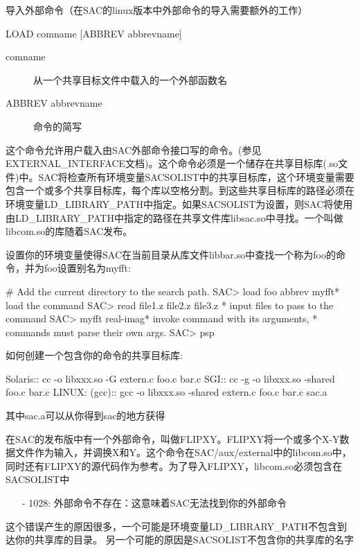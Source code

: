 \label{cmd:load}

导入外部命令（在SAC的linux版本中外部命令的导入需要额外的工作）

\begin{SACSTX}
LOAD comname [ABBREV abbrevname]
\end{SACSTX}

\begin{description}
\item [comname] 从一个共享目标文件中载入的一个外部函数名 
\item [ABBREV abbrevname] 命令的简写 
\end{description}

这个命令允许用户载入由SAC外部命令接口写的命令。(参见EXTERNAL\_INTERFACE文档)。这个命令必须是一个储存在共享目标库(.so文件)中。SAC将检查所有环境变量SACSOLIST中的共享目标库，这个环境变量需要包含一个或多个共享目标库，每个库以空格分割。到这些共享目标库的路径必须在环境变量LD\_LIBRARY\_PATH中指定。如果SACSOLIST为设置，则SAC将使用由LD\_LIBRARY\_PATH中指定的路径在共享文件库libsac.so中寻找。一个叫做libcom.so的库随着SAC发布。

设置你的环境变量使得SAC在当前目录从库文件libbar.so中查找一个称为foo的命令，并为foo设置别名为myfft:
\begin{SACCode}
#  Add the current directory to the search path.
SAC> load foo abbrev myfft* load the command
SAC> read file1.z file2.z file3.z  * input files to pass to the command
SAC> myfft real-imag* invoke command with its arguments,
* commands must parse their own args.
SAC> psp
\end{SACCode}

如何创建一个包含你的命令的共享目标库:
\begin{SACCode}
Solaris::
cc -o libxxx.so -G extern.c foo.c bar.c
SGI::
cc -g -o libxxx.so -shared foo.c bar.c
LINUX: (gcc)::
gcc -o libxxx.so -shared extern.c foo.c bar.c sac.a
\end{SACCode}
其中sac.a可以从你得到sac的地方获得

在SAC的发布版中有一个外部命令，叫做FLIPXY。FLIPXY将一个或多个X-Y数据文件作为输入，并调换X和Y。这个命令在SAC/aux/external中的libcom.so中，同时还有FLIPXY的源代码作为参考。为了导入FLIPXY，libcom.so必须包含在SACSOLIST中

\begin{itemize}
\item[-]1028: 外部命令不存在：这意味着SAC无法找到你的外部命令
\end{itemize}

这个错误产生的原因很多，一个可能是环境变量LD\_LIBRARY\_PATH不包含到达你的共享库的目录。
另一个可能的原因是SACSOLIST不包含你的共享库的名字
